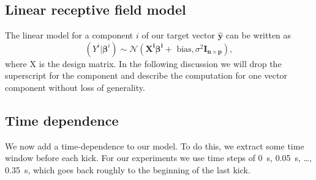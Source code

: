 \documentclass[nobib, a4paper]{tufte-handout}
\begin{document}
\subsection{Linear receptive field model}
\begin{marginfigure}
 \caption{Situation considered for the models without memory:
 We model the heading change of the red fish given the current position and angle of the other fish.}
\end{marginfigure}

The linear model for a component \(i\) of our target vector \(\hat{\bm{y}}\) can be written as
\begin{equation*}
 \left( Y^i | \bm{\beta}^{i} \right)  \sim \mathcal{N} \left( \bm{X^i} \bm{\beta^i} + \text{ bias}, \sigma^2 \bm{I_{n \times p}}  \right),
\end{equation*}
where X is the design matrix.
In the following discussion we will drop the superscript for the component and describe the computation for one vector component without loss of generality.

\subsection{Time dependence}
\begin{marginfigure}
 \caption{Situation considered for the models with memory:
   We model the heading change of the red fish given the trajectory of the other fish.
 The trajectory of the red fish is implicitely encoded in the receptive field as we consider the position of the other fish in the local coordinate system at each point of red's trajectory.}
\end{marginfigure}
We now add a time-dependence to our model.
To do this, we extract some time window before each kick.
For our experiments we use time steps of \SI{0}{\s}, \SI{0.05}{s}, \ldots, \SI{0.35}{\s}, which goes back roughly to the beginning of the last kick.
\end{document}
